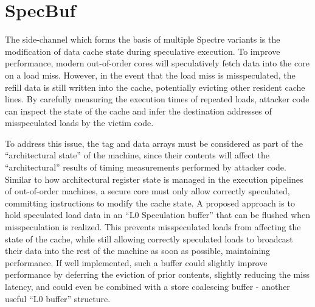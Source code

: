 \section{SpecBuf}
The side-channel which forms the basis of multiple Spectre variants is the modification of data cache state during speculative execution.
To improve performance, modern out-of-order cores will speculatively fetch data into the core on a load miss.
However, in the event that the load miss is misspeculated, the refill data is still written into the cache, potentially evicting other resident cache lines.
By carefully measuring the execution times of repeated loads, attacker code can inspect the state of the cache and infer the destination addresses of misspeculated loads by the victim code.

To address this issue, the tag and data arrays must be considered as part of the ``architectural state'' of the machine, since their contents will affect the ``architectural'' results of timing measurements performed by attacker code.
Similar to how architectural register state is managed in the execution pipelines of out-of-order machines, a secure core must only allow correctly speculated, committing instructions to modify the cache state.
A proposed approach is to hold speculated load data in an ``L0 Speculation buffer'' that can be flushed when misspeculation is realized.
This prevents misspeculated loads from affecting the state of the cache, while still allowing correctly speculated loads to broadcast their data into the rest of the machine as soon as possible, maintaining performance. If well implemented, such a buffer could slightly improve performance by deferring the eviction of prior contents, slightly reducing the miss latency, and could even be combined with a store coalescing buffer - another useful ``L0 buffer'' structure.

